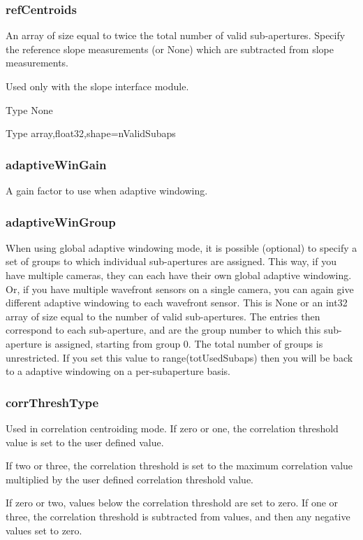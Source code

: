 \documentclass[a4,10pt]{article}
\begin{document}
\subsubsection{refCentroids}
An array of size equal to twice the total number of valid sub-apertures.  Specify the
reference slope measurements (or None) which are subtracted from slope
measurements.

Used only with the slope interface module.

Type None 

Type array,float32,shape=nValidSubaps

\subsubsection{adaptiveWinGain}
A gain factor to use when adaptive windowing.


\subsubsection{adaptiveWinGroup}
When using global adaptive windowing mode, it is possible (optional)
to specify a set of groups to which individual sub-apertures are
assigned.  This way, if you have multiple cameras, they can each have
their own global adaptive windowing.  Or, if you have multiple
wavefront sensors on a single camera, you can again give different
adaptive windowing to each wavefront sensor.  This is None or an int32
array of size equal to the number of valid sub-apertures.  The entries
then correspond to each sub-aperture, and are the group number to
which this sub-aperture is assigned, starting from group 0.  The total
number of groups is unrestricted.  If you set this value to
range(totUsedSubaps) then you will be back to a adaptive windowing on a
per-subaperture basis.

\subsubsection{corrThreshType}
Used in correlation centroiding mode.
If zero or one, the correlation threshold value is set to
the user defined value.

If two or three, the correlation threshold is set to the maximum
correlation value multiplied by the user defined correlation threshold
value.

If zero or two, values below the correlation threshold are set to
zero.  If one or three, the correlation threshold is subtracted from
values, and then any negative values set to zero.
\end{document}
